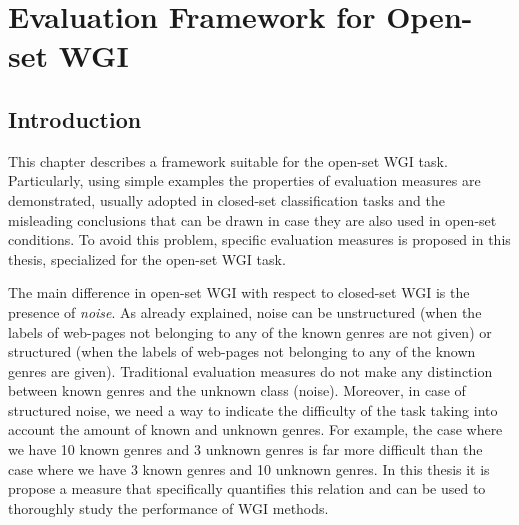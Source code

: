 
\chapter{Evaluation Framework for Open-set WGI}

\label{chap:eval_methods}


\newcommand{\keyword}[1]{\textbf{#1}}
\newcommand{\tabhead}[1]{\textbf{#1}}
\newcommand{\code}[1]{\texttt{#1}}
\newcommand{\file}[1]{\texttt{\bfseries#1}}
\newcommand{\option}[1]{\texttt{\itshape#1}}


\section{Introduction}\label{chap:eval_methods:sec:intro}

This chapter describes a framework suitable for the open-set WGI task. Particularly, using simple examples the properties of evaluation measures are demonstrated, usually adopted in closed-set classification tasks and the misleading conclusions that can be drawn in case they are also used in open-set conditions. To avoid this problem, specific evaluation measures is proposed in this thesis, specialized for the open-set WGI task.

The main difference in open-set WGI with respect to closed-set WGI is the presence of \emph{noise}. As already explained, noise can be unstructured (when the labels of web-pages not belonging to any of the known genres are not given) or structured (when the labels of web-pages not belonging to any of the known genres are given). Traditional evaluation measures do not make any distinction between known genres and the unknown class (noise). Moreover, in case of structured noise, we need a way to indicate the difficulty of the task taking into account the amount of known and unknown genres. For example, the case where we have 10 known genres and 3 unknown genres is far more difficult than the case where we have 3 known genres and 10 unknown genres. In this thesis it is propose a measure that specifically quantifies this relation and can be used to thoroughly study the performance of WGI methods.

